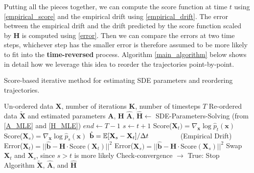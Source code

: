 \documentclass[conference]{IEEEtran}
\begin{document}
Putting all the pieces together, we can compute the score function at time $t$ using \eqref{empirical_score} and the empirical drift
using \eqref{empirical_drift}. The error between the empirical drift and the drift predicted by the score function scaled by $\mathbf{H}$
is computed using \eqref{error}. Then we can compare the errors at two time steps, whichever step has the smaller error is therefore assumed to be more likely to fit into the \textbf{time-reversed} process. Algorithm \ref{main_algorithm} below shows in detail how we leverage this idea to reorder the
trajectories point-by-point.

\begin{algorithm}
    \caption{Score-based iterative method for estimating SDE parameters and reordering trajectories.}
    \label{main_algorithm}
    \begin{algorithmic}[1]
        \renewcommand{\algorithmicrequire}{\textbf{Input:}}
        \renewcommand{\algorithmicensure}{\textbf{Output:}}
        \REQUIRE Un-ordered data $\mathbf{X}$, number of iterations $\mathbf{K}$, number of timesteps $T$
        \ENSURE  Re-ordered data $\tilde{\mathbf{X}}$ and estimated parameters $\mathbf{A}$, $\mathbf{H}$
            \STATE $\hat{\mathbf{A}}$, $\hat{\mathbf{H}} \gets $ SDE-Parameters-Solving (from \eqref{A_MLE} and \eqref{H_MLE})
            \STATE $end \gets T - 1$
                    \STATE $s \gets t + 1$
                    \STATE Score($\mathbf{X}_t) =\nabla_{\mathbf{x}}\log \hat{p}_t(\mathbf{x})$
                    \STATE Score($\mathbf{X}_s) =\nabla_{\mathbf{x}}\log \hat{p}_s(\mathbf{x})$
                    \STATE $\hat{\mathbf{b}} = \mathbb{E}[\mathbf{X}_s - \mathbf{X}_t]/\Delta t \hspace{1.5cm}$ (Empirical Drift)
                    \STATE Error($\mathbf{X}_t) = ||\hat{\mathbf{b}} - \mathbf{H}\cdot\text{Score}(\mathbf{X}_t)||^2$
                    \STATE Error($\mathbf{X}_s) = ||\hat{\mathbf{b}} - \mathbf{H}\cdot\text{Score}(\mathbf{X}_s)||^2$
                        \STATE Swap $\mathbf{X}_t$ and $\mathbf{X}_s$, since $s > t$ is more likely
                    \ENDIF
                \ENDFOR
            \ENDWHILE
            \STATE Check-convergence $\rightarrow$ True: Stop Algorithm
        \ENDFOR
        \RETURN $\tilde{\mathbf{X}}$, $\hat{\mathbf{A}}$, and $\hat{\mathbf{H}}$
    \end{algorithmic} 
\end{algorithm}
\end{document}
